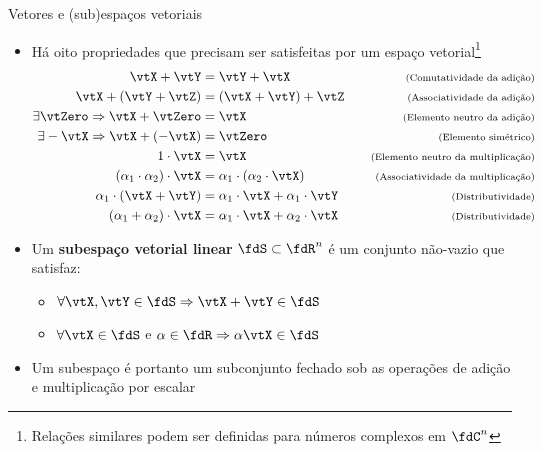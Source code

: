\begin{frame}{Vetores e (sub)espaços vetoriais}
  \begin{itemize}
    \item Há oito propriedades que precisam ser satisfeitas por um espaço vetorial\footnote{Relações similares podem ser definidas para números complexos em $\fdC^n$} \cite[Ex. 2.1.5]{Strang1988}
    {\scriptsize \begin{subequations}\label{eq_vector_space}
      \begin{align}
        \vtX + \vtY &= \vtY + \vtX & \quad \text{\scriptsize(Comutatividade da adição)} \\
        \vtX + (\vtY + \vtZ) &= (\vtX + \vtY) + \vtZ & \quad \text{\scriptsize(Associatividade da adição)} \\
        \exists \vtZero \Rightarrow \vtX + \vtZero &= \vtX & \quad \text{\scriptsize(Elemento neutro da adição)} \\
        \exists -\vtX \Rightarrow \vtX + (-\vtX) &= \vtZero & \quad \text{\scriptsize(Elemento simétrico)} \\
        1\cdot\vtX &= \vtX & \quad \text{\scriptsize(Elemento neutro da multiplicação)} \\
        (\alpha_1\cdot\alpha_2)\cdot\vtX &= \alpha_1\cdot(\alpha_2\cdot\vtX) & \quad \text{\scriptsize(Associatividade da multiplicação)} \\
        \alpha_1\cdot(\vtX + \vtY) &= \alpha_1\cdot\vtX + \alpha_1\cdot\vtY & \quad \text{\scriptsize(Distributividade)} \\
        (\alpha_1 + \alpha_2)\cdot\vtX &= \alpha_1\cdot\vtX + \alpha_2\cdot\vtX & \quad \text{\scriptsize(Distributividade)}
      \end{align}
    \end{subequations}}
    
    \item Um \textbf{\alert{subespaço vetorial linear}} $\fdS \subset \fdR^n$ é um conjunto não-vazio que satisfaz:
    \begin{itemize}
      \item $\forall \vtX, \vtY \in \fdS \Rightarrow \vtX + \vtY \in \fdS$
      \item $\forall \vtX \in \fdS$ e $\alpha \in \fdR \Rightarrow \alpha\vtX \in \fdS$
    \end{itemize}
    
    \item Um subespaço é portanto um subconjunto \alert{fechado} sob as operações de adição e multiplicação por escalar
  \end{itemize}
\end{frame}

